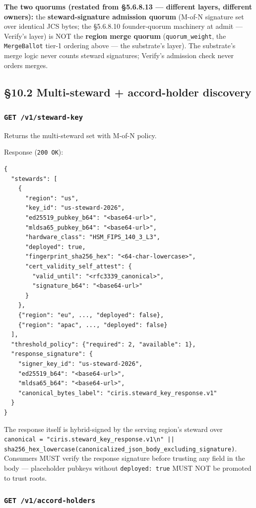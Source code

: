 \documentclass[11pt]{article}
\begin{document}
\textbf{The two quorums (restated from §5.6.8.13 — different layers, different owners):} the \textbf{steward-signature admission quorum} (M-of-N signature set over identical JCS bytes; the §5.6.8.10 founder-quorum machinery at admit — Verify's layer) is NOT the \textbf{region merge quorum} (\texttt{quorum\_weight}, the \texttt{MergeBallot} tier-1 ordering above — the substrate's layer). The substrate's merge logic never counts steward signatures; Verify's admission check never orders merges.


\subsection*{§10.2 Multi-steward + accord-holder discovery}


\subsubsection*{\texttt{GET /v1/steward-key}}


Returns the multi-steward set with M-of-N policy.


Response (\texttt{200 OK}):


\begin{lstlisting}
{
  "stewards": [
    {
      "region": "us",
      "key_id": "us-steward-2026",
      "ed25519_pubkey_b64": "<base64-url>",
      "mldsa65_pubkey_b64": "<base64-url>",
      "hardware_class": "HSM_FIPS_140_3_L3",
      "deployed": true,
      "fingerprint_sha256_hex": "<64-char-lowercase>",
      "cert_validity_self_attest": {
        "valid_until": "<rfc3339_canonical>",
        "signature_b64": "<base64-url>"
      }
    },
    {"region": "eu", ..., "deployed": false},
    {"region": "apac", ..., "deployed": false}
  ],
  "threshold_policy": {"required": 2, "available": 1},
  "response_signature": {
    "signer_key_id": "us-steward-2026",
    "ed25519_b64": "<base64-url>",
    "mldsa65_b64": "<base64-url>",
    "canonical_bytes_label": "ciris.steward_key_response.v1"
  }
}
\end{lstlisting}

The response itself is hybrid-signed by the serving region's steward over \texttt{canonical = "ciris.steward\_key\_response.v1\textbackslash{}n" || sha256\_hex\_lowercase(canonicalized\_json\_body\_excluding\_signature)}. Consumers MUST verify the response signature before trusting any field in the body — placeholder pubkeys without \texttt{deployed: true} MUST NOT be promoted to trust roots.


\subsubsection*{\texttt{GET /v1/accord-holders}}
\end{document}
